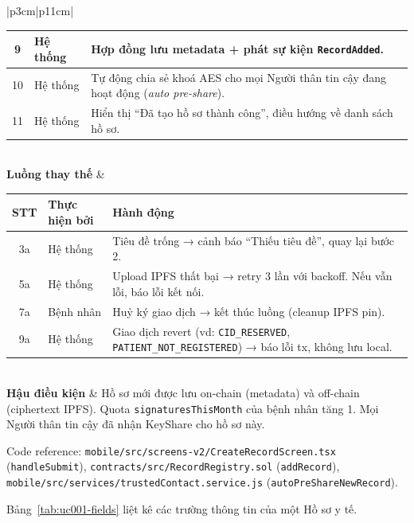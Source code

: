 \documentclass[../DoAn]{subfiles}
\begin{document}
\begin{table}[H]
\begin{tabular}{|p{3cm}|p{11cm}|}
\begin{tabular}{|c|p{2.3cm}|p{6cm}|}
9 & Hệ thống & Hợp đồng lưu metadata + phát sự kiện \texttt{RecordAdded}. \\ \hline
10 & Hệ thống & Tự động chia sẻ khoá AES cho mọi Người thân tin cậy đang hoạt động (\textit{auto pre-share}). \\ \hline
11 & Hệ thống & Hiển thị ``Đã tạo hồ sơ thành công'', điều hướng về danh sách hồ sơ. \\ \hline
\end{tabular} \\ \hline
\textbf{Luồng thay thế} &
\begin{tabular}{|c|p{2.3cm}|p{6cm}|}
\hline
\textbf{STT} & \textbf{Thực hiện bởi} & \textbf{Hành động} \\ \hline
3a & Hệ thống & Tiêu đề trống → cảnh báo ``Thiếu tiêu đề'', quay lại bước 2. \\ \hline
5a & Hệ thống & Upload IPFS thất bại → retry 3 lần với backoff. Nếu vẫn lỗi, báo lỗi kết nối. \\ \hline
7a & Bệnh nhân & Huỷ ký giao dịch → kết thúc luồng (cleanup IPFS pin). \\ \hline
9a & Hệ thống & Giao dịch revert (vd: \texttt{CID\_RESERVED}, \texttt{PATIENT\_NOT\_REGISTERED}) → báo lỗi tx, không lưu local. \\ \hline
\end{tabular} \\ \hline
\textbf{Hậu điều kiện} & Hồ sơ mới được lưu on-chain (metadata) và off-chain (ciphertext IPFS). Quota \texttt{signaturesThisMonth} của bệnh nhân tăng 1. Mọi Người thân tin cậy đã nhận KeyShare cho hồ sơ này. \\ \hline
\end{tabular}
\end{table}

Code reference: \texttt{mobile/src/screens-v2/CreateRecordScreen.tsx} (\texttt{handleSubmit}), \texttt{contracts/src/RecordRegistry.sol} (\texttt{addRecord}), \texttt{mobile/src/services/trustedContact.service.js} (\texttt{autoPreShareNewRecord}).

Bảng~\ref{tab:uc001-fields} liệt kê các trường thông tin của một Hồ sơ y tế.
\end{document}
